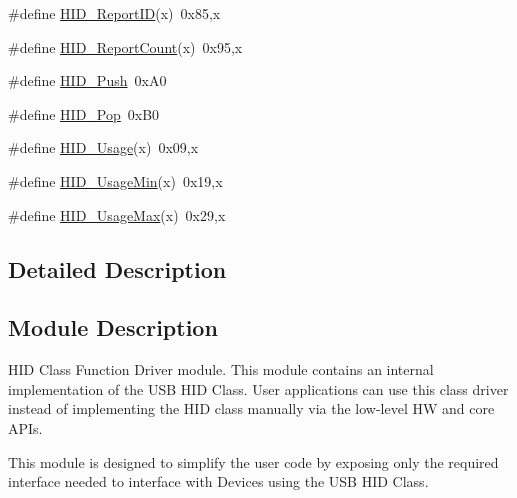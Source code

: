 \begin{DoxyCompactItemize}
\item 
\#define \hyperlink{group__USBD__HID_gaa93166c105cb62d10a32e74c251be43b}{H\-I\-D\-\_\-\-Report\-I\-D}(x)~0x85,x
\item 
\#define \hyperlink{group__USBD__HID_gab331e3dbe15f3780cd3ff4a88e03012d}{H\-I\-D\-\_\-\-Report\-Count}(x)~0x95,x
\item 
\#define \hyperlink{group__USBD__HID_ga4426093eb43ab09033d2399464b8e8da}{H\-I\-D\-\_\-\-Push}~0x\-A0
\item 
\#define \hyperlink{group__USBD__HID_gada716b64e26ea0ba3100fca08fa540cc}{H\-I\-D\-\_\-\-Pop}~0x\-B0
\item 
\#define \hyperlink{group__USBD__HID_gae78646c72db02459eabce39de60ab5e7}{H\-I\-D\-\_\-\-Usage}(x)~0x09,x
\item 
\#define \hyperlink{group__USBD__HID_gae9d61686baf254c0eb4ba18a9c53a2c4}{H\-I\-D\-\_\-\-Usage\-Min}(x)~0x19,x
\item 
\#define \hyperlink{group__USBD__HID_ga63abf1e2542b915d9dcdb3068e3ea606}{H\-I\-D\-\_\-\-Usage\-Max}(x)~0x29,x
\end{DoxyCompactItemize}


\subsection{Detailed Description}
\hypertarget{group__USBD__HID_Sec_HIDModDescription}{}\subsection{Module Description}\label{group__USBD__HID_Sec_HIDModDescription}
H\-I\-D Class Function Driver module. This module contains an internal implementation of the U\-S\-B H\-I\-D Class. User applications can use this class driver instead of implementing the H\-I\-D class manually via the low-\/level H\-W and core A\-P\-Is.

This module is designed to simplify the user code by exposing only the required interface needed to interface with Devices using the U\-S\-B H\-I\-D Class. 

